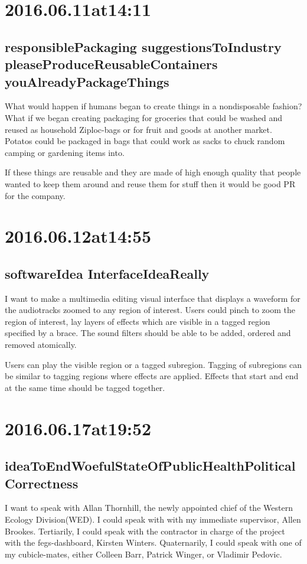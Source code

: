 \begin{enumerate}
\section*{ 2016.06.11at14:11 }
\subsection*{responsiblePackaging suggestionsToIndustry pleaseProduceReusableContainers youAlreadyPackageThings}
What would happen if humans began to create things in a nondisposable fashion? What if we began creating packaging for groceries that could be washed and reused as household Ziploc-bags or for fruit and goods at another market. Potatos could be packaged in bags that could work as sacks to chuck random camping or gardening items into.

If these things are reusable and they are made of high enough quality that people wanted to keep them around and reuse them for stuff then it would be good PR for the company.

\section*{ 2016.06.12at14:55 }
\subsection*{softwareIdea InterfaceIdeaReally}
I want to make a multimedia editing visual interface that displays a waveform for the audiotracks zoomed to any region of interest. Users could pinch to zoom the region of interest, lay layers of effects which are visible in a tagged region specified by a brace. The sound filters should be able to be added, ordered and removed atomically.

Users can play the visible region or a tagged subregion. Tagging of subregions can be similar to tagging regions where effects are applied. Effects that start and end at the same time should be tagged together.

\section*{ 2016.06.17at19:52 }
\subsection*{ideaToEndWoefulStateOfPublicHealthPoliticalCorrectness}
I want to speak with Allan Thornhill, the newly appointed chief of the Western Ecology Division(WED). I could speak with with my immediate supervisor, Allen Brookes. Tertiarily, I could speak with the contractor in charge of the project with the fegs-dashboard, Kirsten Winters. Quaternarily, I could speak with one of my cubicle-mates, either Colleen Barr, Patrick Winger, or Vladimir Pedovic.


\end{enumerate}
